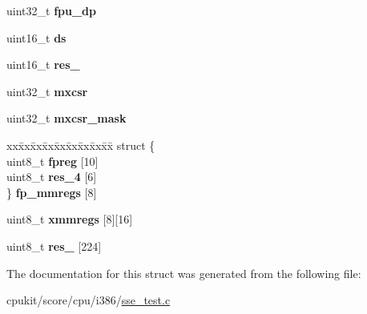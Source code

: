 \begin{DoxyCompactItemize}
uint32\+\_\+t {\bfseries fpu\+\_\+dp}
\item 
\mbox{\label{structContext__Control__sse_a988f19ead41fd09686ca684cbe610070}} 
uint16\+\_\+t {\bfseries ds}
\item 
\mbox{\label{structContext__Control__sse_abaa755d9a50d0f677867ba58920cbdc8}} 
uint16\+\_\+t {\bfseries res\+\_}
\item 
\mbox{\label{structContext__Control__sse_a611745ce55e1effda52e9adc6de9c438}} 
uint32\+\_\+t {\bfseries mxcsr}
\item 
\mbox{\label{structContext__Control__sse_a4f72868a4e0db504191a4f25fc88e508}} 
uint32\+\_\+t {\bfseries mxcsr\+\_\+mask}
\item 
\mbox{\label{structContext__Control__sse_af98634cc61580ba88aa12107b4073ce6}} 
\begin{tabbing}
xx\=xx\=xx\=xx\=xx\=xx\=xx\=xx\=xx\=\kill
struct \{\\
\>uint8\_t {\bfseries fpreg} \mbox{[}10\mbox{]}\\
\>uint8\_t {\bfseries res\_4} \mbox{[}6\mbox{]}\\
\} {\bfseries fp\_mmregs} \mbox{[}8\mbox{]}\\

\end{tabbing}\item 
\mbox{\label{structContext__Control__sse_a607599f2a1c36fe7ca7c2b7a2df0ac72}} 
uint8\+\_\+t {\bfseries xmmregs} \mbox{[}8\mbox{]}\mbox{[}16\mbox{]}
\item 
\mbox{\label{structContext__Control__sse_a49c6be9d6d70a0f07d58e97c186e8eb7}} 
uint8\+\_\+t {\bfseries res\+\_} \mbox{[}224\mbox{]}
\end{DoxyCompactItemize}


The documentation for this struct was generated from the following file\+:\begin{DoxyCompactItemize}
\item 
cpukit/score/cpu/i386/\mbox{\hyperlink{sse__test_8c}{sse\+\_\+test.\+c}}\end{DoxyCompactItemize}
